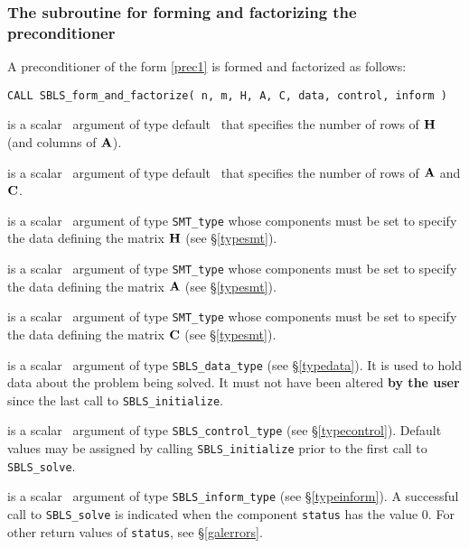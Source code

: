 \documentclass{galahad}
\newcommand{\packagename}{SBLS}
\begin{document}

\subsubsection{The subroutine for forming and factorizing the preconditioner}
A preconditioner of the form \ref{prec1} is formed and factorized as follows:
\vspace*{1mm}

\hspace{8mm}
{\tt CALL \packagename\_form\_and\_factorize( n, m, H, A, C, data, control, inform )}

\begin{description}
 is a scalar \intentin\ argument of type default \integer\ that specifies
the number of rows of ${\mathbf{H}}$ (and columns of ${\mathbf{A}}$).

 is a scalar \intentin\ argument of type default \integer\ that specifies
the number of rows of ${\mathbf{A}}$ and ${\mathbf{C}}$.

 is a scalar \intentin\ argument of type {\tt SMT\_type} whose
components must be set to specify the data defining the matrix ${\mathbf{H}}$ 
(see \S\ref{typesmt}).

 is a scalar \intentin\ argument of type {\tt SMT\_type} whose
components must be set to specify the data defining the matrix ${\mathbf{A}}$ 
(see \S\ref{typesmt}).

 is a scalar \intentin\ argument of type {\tt SMT\_type} whose
components must be set to specify the data defining the matrix ${\mathbf{C}}$ 
(see \S\ref{typesmt}).

 is a scalar \intentinout\ argument of type 
{\tt \packagename\_data\_type}
(see \S\ref{typedata}). It is used to hold data about the problem being 
solved. It must not have been altered {\bf by the user} since the last call to 
{\tt \packagename\_initialize}.

 is a scalar \intentin\ argument of type 
{\tt \packagename\_control\_type}
(see \S\ref{typecontrol}). Default values may be assigned by calling 
{\tt \packagename\_initialize} prior to the first call to 
{\tt \packagename\_solve}.

 is a scalar \intentout\ argument of type 
{\tt \packagename\_inform\_type}
(see \S\ref{typeinform}). A successful call to
{\tt \packagename\_solve}
is indicated when the  component {\tt status} has the value 0. 
For other return values of {\tt status}, see \S\ref{galerrors}.

\end{description}
\end{document}
